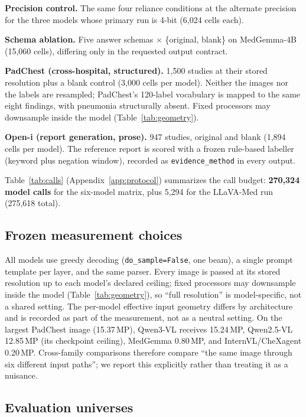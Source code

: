 \textbf{Precision control.} The same four reliance conditions at the alternate precision for the three models whose primary run is 4-bit (6,024 cells each).

\textbf{Schema ablation.} Five answer schemas $\times$ \{original, blank\} on MedGemma-4B (15,060 cells), differing only in the requested output contract.

\textbf{PadChest (cross-hospital, structured).} 1,500 studies at their stored resolution plus a blank control (3,000 cells per model). Neither the images nor the labels are resampled; PadChest's 120-label vocabulary is mapped to the same eight findings, with pneumonia structurally absent. Fixed processors may downsample inside the model (Table~\ref{tab:geometry}).

\textbf{Open-i (report generation, prose).} 947 studies, original and blank (1,894 cells per model). The reference report is scored with a frozen rule-based labeller (keyword plus negation window), recorded as \texttt{evidence\_method} in every output.

Table~\ref{tab:calls} (Appendix~\ref{app:protocol}) summarizes the call budget: \textbf{270,324 model calls} for the six-model matrix, plus 5,294 for the LLaVA-Med run (275,618 total).

\subsection{Frozen measurement choices}

All models use greedy decoding (\texttt{do\_sample=False}, one beam), a single prompt template per layer, and the same parser. Every image is passed at its stored resolution up to each model's declared ceiling; fixed processors may downsample inside the model (Table~\ref{tab:geometry}), so ``full resolution'' is model-specific, not a shared setting. The per-model effective input geometry differs by architecture and is recorded as part of the measurement, not as a neutral setting. On the largest PadChest image (15.37\,MP), Qwen3-VL receives 15.24\,MP, Qwen2.5-VL 12.85\,MP (its checkpoint ceiling), MedGemma 0.80\,MP, and InternVL/CheXagent 0.20\,MP. Cross-family comparisons therefore compare ``the same image through six different input paths''; we report this explicitly rather than treating it as a nuisance.

\subsection{Evaluation universes}

